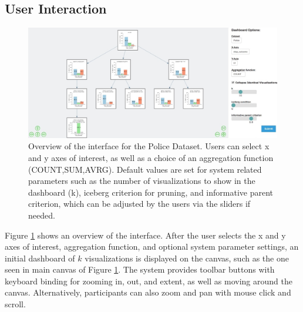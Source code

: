 \subsection{User Interaction\label{interaction}}
\begin{figure}[ht!]
\centering
\includegraphics[width=\linewidth]{figures/overview.jpeg}
\caption{Overview of the \system interface for the Police Dataset. Users can select x and y axes of interest, as well as a choice of an aggregation function (COUNT,SUM,AVRG). Default values are set for system related parameters such as the number of visualizations to show in the dashboard (k), iceberg criterion for pruning, and informative parent criterion, which can be adjusted by the users via the sliders if needed.}
\label{fig:overview}
\end{figure}
\par Figure \ref{fig:overview} shows an overview of the \system interface. After the user selects the x and y axes of interest, aggregation function, and optional system parameter settings, an initial dashboard of $k$ visualizations is displayed on the canvas, such as the one seen in main canvas of Figure \ref{fig:overview}. The system provides toolbar buttons with keyboard binding for zooming in, out, and extent, as well as moving around the canvas. Alternatively, participants can also zoom and pan with mouse click and scroll.
